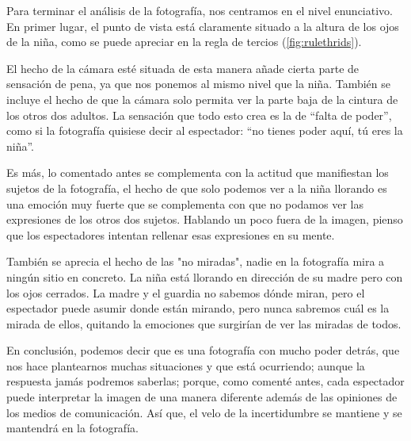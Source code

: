 \documentclass[11pt]{article}
\begin{document}
Para terminar el análisis de la fotografía, nos centramos en el nivel enunciativo.
En primer lugar, el punto de vista está claramente situado a la altura de los ojos de la niña, como se puede apreciar en la regla de tercios (\ref{fig:rulethrids}).\newline

El hecho de la cámara esté situada de esta manera añade cierta parte de sensación de pena, ya que nos ponemos al mismo nivel que la niña. También se incluye el hecho de que la cámara solo permita ver la parte baja de la cintura de los otros dos adultos. La sensación que todo esto crea es la de “falta de poder”, como si la fotografía quisiese decir al espectador: “no tienes poder aquí, tú eres la niña”. \newline

Es más, lo comentado antes se complementa con la actitud que manifiestan los sujetos de la fotografía, el hecho de que solo podemos ver a la niña llorando es una emoción muy fuerte que se complementa con que no podamos ver las expresiones de los otros dos sujetos. Hablando un poco fuera de la imagen, pienso que los espectadores intentan rellenar esas expresiones en su mente. \newline

También se aprecia el hecho de las "no miradas", nadie en la fotografía mira a ningún sitio en concreto. La niña está llorando en dirección de su madre pero con los ojos cerrados. La madre y el guardia no sabemos dónde miran, pero el espectador puede asumir donde están mirando, pero nunca sabremos cuál es la mirada de ellos, quitando la emociones que surgirían de ver las miradas de todos. \newline

En conclusión, podemos decir que es una fotografía con mucho poder detrás, que nos hace plantearnos muchas situaciones y que está ocurriendo; aunque la respuesta jamás podremos saberlas; porque, como comenté antes, cada espectador puede interpretar la imagen de una manera diferente además de las opiniones de los medios de comunicación. \newline 
Así que, el velo de la incertidumbre se mantiene y se mantendrá en la fotografía.

\newpage

\printbibliography[title=\textbf{Bibliografía}]
\end{document}
